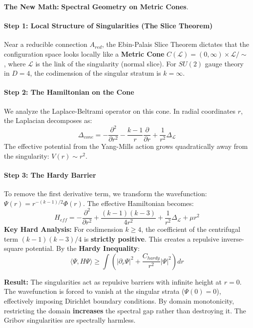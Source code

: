 \textbf{The New Math:} \textbf{Spectral Geometry on Metric Cones}.

\paragraph{Step 1: Local Structure of Singularities (The Slice Theorem)}
Near a reducible connection $A_{red}$, the Ebin-Palais Slice Theorem dictates that the configuration space looks locally like a \textbf{Metric Cone} $C(\mathcal{L}) = (0, \infty) \times \mathcal{L} / \sim$, where $\mathcal{L}$ is the link of the singularity (normal slice).
For $SU(2)$ gauge theory in $D=4$, the codimension of the singular stratum is $k = \infty$.

\paragraph{Step 2: The Hamiltonian on the Cone}
We analyze the Laplace-Beltrami operator on this cone. In radial coordinates $r$, the Laplacian decomposes as:
\begin{equation}
\Delta_{cone} = -\frac{\partial^2}{\partial r^2} - \frac{k-1}{r} \frac{\partial}{\partial r} + \frac{1}{r^2} \Delta_{\mathcal{L}}
\end{equation}
The effective potential from the Yang-Mills action grows quadratically away from the singularity: $V(r) \sim r^2$.

\paragraph{Step 3: The Hardy Barrier}
To remove the first derivative term, we transform the wavefunction: $\Psi(r) = r^{-(k-1)/2} \Phi(r)$. The effective Hamiltonian becomes:
\begin{equation}
H_{eff} = -\frac{\partial^2}{\partial r^2} + \frac{(k-1)(k-3)}{4r^2} + \frac{1}{r^2}\Delta_{\mathcal{L}} + \mu r^2
\end{equation}
\textbf{Key Hard Analysis:} For codimension $k \ge 4$, the coefficient of the centrifugal term $(k-1)(k-3)/4$ is \textbf{strictly positive}.
This creates a repulsive inverse-square potential. By the \textbf{Hardy Inequality}:
\begin{equation}
\langle \Psi, H \Psi \rangle \ge \int \left( |\partial_r \Psi|^2 + \frac{C_{hardy}}{r^2} |\Psi|^2 \right) dr
\end{equation}

\textbf{Result:} The singularities act as repulsive barriers with infinite height at $r=0$. The wavefunction is forced to vanish at the singular strata ($\Psi(0)=0$), effectively imposing Dirichlet boundary conditions. By domain monotonicity, restricting the domain \textbf{increases} the spectral gap rather than destroying it. The Gribov singularities are spectrally harmless.

